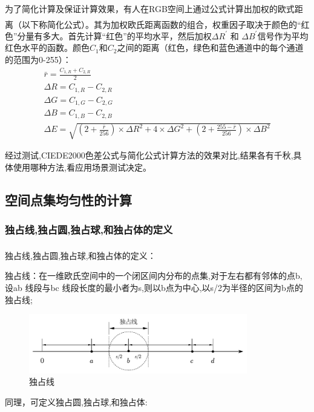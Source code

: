 \documentclass{article}
\newcommand{\upcite}[1]{\textsuperscript{\textsuperscript{\cite{#1}}}}
\begin{document}
 为了简化计算及保证计算效果，有人在RGB空间上通过公式计算出加权的欧式距离\upcite{SeDuZhiBiao}（以下称简化公式）。其为加权欧氏距离函数的组合，权重因子取决于颜色的“红色”分量有多大。首先计算“红色”的平均水平，然后加权$\Delta R^{\prime}$ 和 $\Delta B^{\prime}$信号作为平均红色水平的函数。颜色$C_1$和$C_2$之间的距离（红色，绿色和蓝色通道中的每个通道的范围为0-255）：
 \begin{equation}
 \begin{array}{l}
 \bar{r}=\frac{C_{1, R}+C_{2, R}}{2} \\
 \Delta R=C_{1, R}-C_{2, R} \\
 \Delta G=C_{1, G}-C_{2, G} \\
 \Delta B=C_{1, B}-C_{2, B} \\
 \Delta E=\sqrt{\left(2+\frac{\bar{r}}{256}\right) \times \Delta R^{2}+4 \times \Delta G^{2}+\left(2+\frac{255-\bar{r}}{256}\right) \times \Delta B^{2}}
 \end{array}
 \label{jianhuags}
 \end{equation}
 
 经过测试,CIEDE2000色差公式与简化公式计算方法的效果对比,结果各有千秋,具体使用哪种方法,看应用场景测试决定。
 \subsection{空间点集均匀性的计算}
 \subsubsection{独占线,独占圆,独占球,和独占体的定义}
 独占线,独占圆,独占球,和独占体的定义\upcite{luoDianKongJianFenXiFenWeiYuJunYunDu2004}：
 
 独占线：在一维欧氏空间中的一个闭区间内分布的点集,对于左右都有邻体的点b,设ab 线段与bc 线段长度的最小者为s,则以b点为中心,以s/2为半径的区间为b点的独占线;
  \begin{figure}[H]
 	\centering
 	\includegraphics[width=0.85\textwidth]{img/独占线.png}
 	\caption{独占线}
 	\label{独占线}
 \end{figure}

 同理，可定义独占圆,独占球,和独占体:
 
\end{document}
